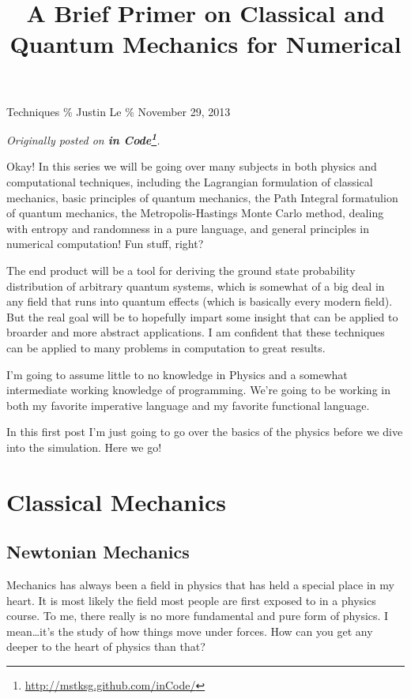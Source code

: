 \documentclass[]{article}
\title{A Brief Primer on Classical and Quantum Mechanics for Numerical}
\renewcommand{\href}[2]{#2\footnote{\url{#1}}}
\begin{document}
\maketitle

Techniques \% Justin Le \% November 29, 2013

\emph{Originally posted on
\textbf{\href{http://mstksg.github.com/inCode/}{in Code}}.}

Okay! In this series we will be going over many subjects in both physics
and computational techniques, including the Lagrangian formulation of
classical mechanics, basic principles of quantum mechanics, the Path
Integral formatulion of quantum mechanics, the Metropolis-Hastings Monte
Carlo method, dealing with entropy and randomness in a pure language,
and general principles in numerical computation! Fun stuff, right?

The end product will be a tool for deriving the ground state probability
distribution of arbitrary quantum systems, which is somewhat of a big
deal in any field that runs into quantum effects (which is basically
every modern field). But the real goal will be to hopefully impart some
insight that can be applied to broarder and more abstract applications.
I am confident that these techniques can be applied to many problems in
computation to great results.

I'm going to assume little to no knowledge in Physics and a somewhat
intermediate working knowledge of programming. We're going to be working
in both my favorite imperative language and my favorite functional
language.

In this first post I'm just going to go over the basics of the physics
before we dive into the simulation. Here we go!

\section{Classical Mechanics}\label{classical-mechanics}

\subsection{Newtonian Mechanics}\label{newtonian-mechanics}

Mechanics has always been a field in physics that has held a special
place in my heart. It is most likely the field most people are first
exposed to in a physics course. To me, there really is no more
fundamental and pure form of physics. I mean\ldots{}it's the study of
how things move under forces. How can you get any deeper to the heart of
physics than that?
\end{document}
